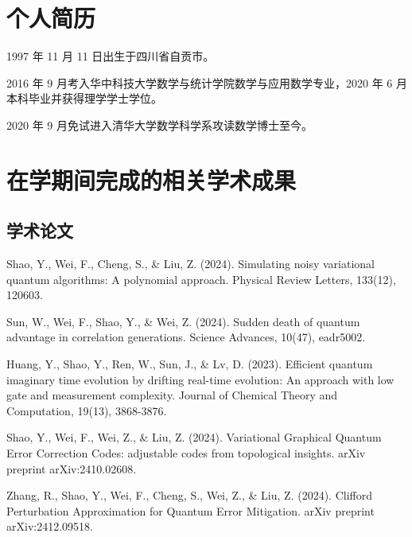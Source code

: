 
\begin{resume}

  \section*{个人简历}

  1997 年 11 月 11 日出生于四川省自贡市。

  2016 年 9 月考入华中科技大学数学与统计学院数学与应用数学专业，2020 年 6 月本科毕业并获得理学学士学位。

  2020 年 9 月免试进入清华大学数学科学系攻读数学博士至今。


  \section*{在学期间完成的相关学术成果}

  \subsection*{学术论文}

  \begin{achievements}
    \item Shao, Y., Wei, F., Cheng, S., \& Liu, Z. (2024). Simulating noisy variational quantum algorithms: A polynomial approach. Physical Review Letters, 133(12), 120603.
    \item Sun, W., Wei, F., Shao, Y., \& Wei, Z. (2024). Sudden death of quantum advantage in correlation generations. Science Advances, 10(47), eadr5002.
    \item Huang, Y., Shao, Y., Ren, W., Sun, J., \& Lv, D. (2023). Efficient quantum imaginary time evolution by drifting real-time evolution: An approach with low gate and measurement complexity. Journal of Chemical Theory and Computation, 19(13), 3868-3876.
    \item Shao, Y., Wei, F., Wei, Z., \& Liu, Z. (2024). Variational Graphical Quantum Error Correction Codes: adjustable codes from topological insights. arXiv preprint arXiv:2410.02608.
    \item Zhang, R., Shao, Y., Wei, F., Cheng, S., Wei, Z., \& Liu, Z. (2024). Clifford Perturbation Approximation for Quantum Error Mitigation. arXiv preprint arXiv:2412.09518.
  \end{achievements}




\end{resume}
